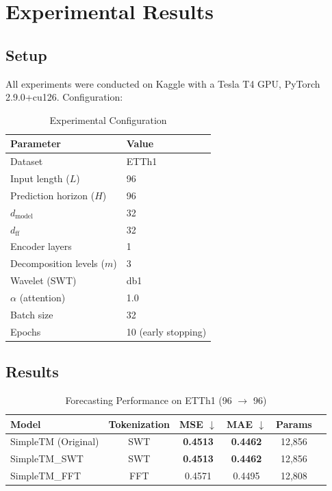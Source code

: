 \documentclass[12pt,a4paper]{article}
\begin{document}
\section{Experimental Results}

\subsection{Setup}

All experiments were conducted on Kaggle with a Tesla T4 GPU, PyTorch 2.9.0+cu126. Configuration:

\begin{table}[H]
\centering
\caption{Experimental Configuration}
\begin{tabular}{ll}
\toprule
\textbf{Parameter} & \textbf{Value} \\
\midrule
Dataset & ETTh1 \\
Input length ($L$) & 96 \\
Prediction horizon ($H$) & 96 \\
$d_\text{model}$ & 32 \\
$d_\text{ff}$ & 32 \\
Encoder layers & 1 \\
Decomposition levels ($m$) & 3 \\
Wavelet (SWT) & db1 \\
$\alpha$ (attention) & 1.0 \\
Batch size & 32 \\
Epochs & 10 (early stopping) \\
\bottomrule
\end{tabular}
\end{table}

\subsection{Results}

\begin{table}[H]
\centering
\caption{Forecasting Performance on ETTh1 (96 $\rightarrow$ 96)}
\label{tab:results}
\begin{tabular}{lccccc}
\toprule
\textbf{Model} & \textbf{Tokenization} & \textbf{MSE $\downarrow$} & \textbf{MAE $\downarrow$} & \textbf{Params} \\
\midrule
SimpleTM (Original) & SWT & \textbf{0.4513} & \textbf{0.4462} & 12,856 \\
SimpleTM\_SWT & SWT & \textbf{0.4513} & \textbf{0.4462} & 12,856 \\
SimpleTM\_FFT & FFT & 0.4571 & 0.4495 & 12,808 \\
\bottomrule
\end{tabular}
\end{table}
\end{document}
